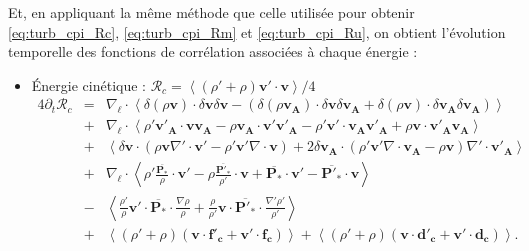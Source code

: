 Et, en appliquant la  même méthode que celle utilisée pour obtenir \eqref{eq:turb_cpi_Rc}, \eqref{eq:turb_cpi_Rm} et \eqref{eq:turb_cpi_Ru}, on obtient l'évolution temporelle des fonctions de corrélation associées à chaque énergie : 
\begin{itemize}
    \item Énergie cinétique : $\mathcal{R}_{c} = \left<\left(\rho'+\rho\right)\boldsymbol{v'} \cdot \boldsymbol{v}\right>/4 $
\begin{eqnarray}
\label{eq:turb_cpg_Rc} 4\partial_t \mathcal{R}_{c} &=& \nabla_{\boldsymbol{\ell}} \cdot \left<\delta \left(\rho\boldsymbol{v}\right) \cdot \delta \boldsymbol{v} \delta \boldsymbol{v} -\left(\delta \left(\rho\boldsymbol{v_A}\right) \cdot \delta \boldsymbol{v} \delta \boldsymbol{v_A} + \delta \left(\rho\boldsymbol{v}\right) \cdot \delta \boldsymbol{v_A} \delta \boldsymbol{v_A} \right)\right>\nonumber \\
&+& \nabla_{\boldsymbol{\ell}} \cdot \left<\rho' \boldsymbol{v'_A}\cdot  \boldsymbol{v} \boldsymbol{v_A} -\rho \boldsymbol{v_A}\cdot  \boldsymbol{v'} \boldsymbol{v'_A}-\rho' \boldsymbol{v'} \cdot\boldsymbol{v_A}\boldsymbol{v'_A} +  \rho  \boldsymbol{v} \cdot\boldsymbol{v'_A}\boldsymbol{v_A}\right> \nonumber\\
& +&\left<\delta \boldsymbol{v}\cdot \left( \rho \boldsymbol{v}  \nabla' \cdot \boldsymbol{v'} -\rho' \boldsymbol{v'} \nabla \cdot \boldsymbol{v} \right)+2 \delta \boldsymbol{v_A}\cdot \left( \rho' \boldsymbol{v'} \nabla \cdot \boldsymbol{v_A} - \rho \boldsymbol{v} \right) \nabla' \cdot \boldsymbol{v'_A}\right> \nonumber\\
&+&  \nabla_{\boldsymbol{\ell}} \cdot \left< \rho' \frac{ \overline{\boldsymbol{P_*}}}{\rho} \cdot \boldsymbol{v'} -  \rho \frac{\overline{\boldsymbol{P'_*}}}{\rho'} \cdot \boldsymbol{v} + \overline{\boldsymbol{P_*}} \cdot \boldsymbol{v'} -  \overline{\boldsymbol{P'_*}} \cdot \boldsymbol{v} \right>\nonumber \\
&-& \left<\frac{\rho'}{\rho} \boldsymbol{v'} \cdot \overline{\boldsymbol{P_*}}  \cdot \frac{\nabla \rho}{\rho} + \frac{\rho}{\rho'} \boldsymbol{v} \cdot \overline{\boldsymbol{P'_*}}   \cdot \frac{\nabla' \rho'}{\rho'} \right>\nonumber\\
&+&  \left<\left(\rho' + \rho\right)\left(\boldsymbol{v} \cdot \boldsymbol{f'_c} + \boldsymbol{v'} \cdot \boldsymbol{f_c}\right) \right>+ \left<\left(\rho' + \rho\right)\left(\boldsymbol{v} \cdot \boldsymbol{d'_c} + \boldsymbol{v'} \cdot \boldsymbol{d_c}\right)\right> .
\end{eqnarray}

\end{itemize}
